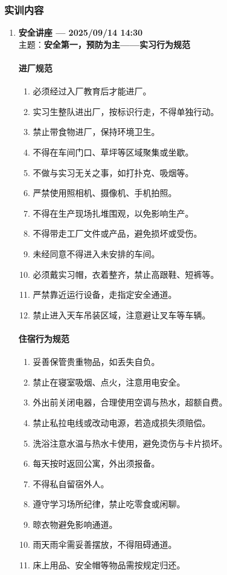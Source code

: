 \subsubsection{实训内容}
\begin{enumerate}[label=\arabic*., labelindent=0pt, itemindent=2em, listparindent=0pt, left=1.5em]
\item \textbf{安全讲座 — 2025/09/14 14:30}\\
主题：\textbf{安全第一，预防为主——实习行为规范}

\paragraph{进厂规范}
\begin{enumerate}[label*=\arabic*.]
  \item 必须经过入厂教育后才能进厂。
  \item 实习生整队进出厂，按标识行走，不得单独行动。
  \item 禁止带食物进厂，保持环境卫生。
  \item 不得在车间门口、草坪等区域聚集或坐歇。
  \item 不做与实习无关之事，如打扑克、吸烟等。
  \item 严禁使用照相机、摄像机、手机拍照。
  \item 不得在生产现场扎堆围观，以免影响生产。
  \item 不得带走工厂文件或产品，避免损坏或受伤。
  \item 未经同意不得进入未安排的车间。
  \item 必须戴实习帽，衣着整齐，禁止高跟鞋、短裤等。
  \item 严禁靠近运行设备，走指定安全通道。
  \item 禁止进入天车吊装区域，注意避让叉车等车辆。
\end{enumerate}

\paragraph{住宿行为规范}
\begin{enumerate}[label*=\arabic*.]
  \item 妥善保管贵重物品，如丢失自负。
  \item 禁止在寝室吸烟、点火，注意用电安全。
  \item 外出前关闭电器，合理使用空调与热水，超额自费。
  \item 禁止私拉电线或改动电源，若造成损失须赔偿。
  \item 洗浴注意水温与热水卡使用，避免烫伤与卡片损坏。
  \item 每天按时返回公寓，外出须报备。
  \item 不得私自留宿外人。
  \item 遵守学习场所纪律，禁止吃零食或闲聊。
  \item 晾衣物避免影响通道。
  \item 雨天雨伞需妥善摆放，不得阻碍通道。
  \item 床上用品、安全帽等物品需按规定归还。
\end{enumerate}


\end{enumerate}
